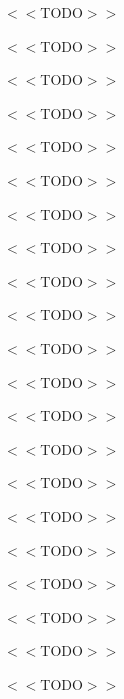\begin{DoxyItemize}
\item $<$$<$\+T\+O\+D\+O$>$$>$
\item $<$$<$\+T\+O\+D\+O$>$$>$
\item $<$$<$\+T\+O\+D\+O$>$$>$
\end{DoxyItemize}


\begin{DoxyItemize}
\item $<$$<$\+T\+O\+D\+O$>$$>$
\item $<$$<$\+T\+O\+D\+O$>$$>$
\item $<$$<$\+T\+O\+D\+O$>$$>$
\end{DoxyItemize}


\begin{DoxyItemize}
\item $<$$<$\+T\+O\+D\+O$>$$>$
\item $<$$<$\+T\+O\+D\+O$>$$>$
\item $<$$<$\+T\+O\+D\+O$>$$>$
\end{DoxyItemize}


\begin{DoxyItemize}
\item $<$$<$\+T\+O\+D\+O$>$$>$
\item $<$$<$\+T\+O\+D\+O$>$$>$
\item $<$$<$\+T\+O\+D\+O$>$$>$
\end{DoxyItemize}


\begin{DoxyItemize}
\item $<$$<$\+T\+O\+D\+O$>$$>$
\item $<$$<$\+T\+O\+D\+O$>$$>$
\item $<$$<$\+T\+O\+D\+O$>$$>$
\end{DoxyItemize}


\begin{DoxyItemize}
\item $<$$<$\+T\+O\+D\+O$>$$>$
\item $<$$<$\+T\+O\+D\+O$>$$>$
\item $<$$<$\+T\+O\+D\+O$>$$>$
\end{DoxyItemize}


\begin{DoxyItemize}
\item $<$$<$\+T\+O\+D\+O$>$$>$
\item $<$$<$\+T\+O\+D\+O$>$$>$
\item $<$$<$\+T\+O\+D\+O$>$$>$
\end{DoxyItemize}


